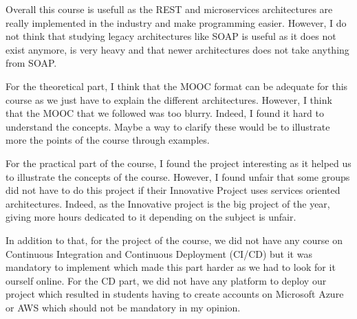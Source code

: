 Overall this course is usefull as the REST and microservices architectures are really implemented in the industry and make programming easier. However, I do not think that studying legacy architectures like SOAP is useful as it does not exist anymore, is very heavy and that newer architectures does not take anything from SOAP.
\smallskip

For the theoretical part, I think that the MOOC format can be adequate for this course as we just have to explain the different architectures. However, I think that the MOOC that we followed was too blurry. Indeed, I found it hard to understand the concepts. Maybe a way to clarify these would be to illustrate more the points of the course through examples.
\smallskip

For the practical part of the course, I found the project interesting as it helped us to illustrate the concepts of the course. However, I found unfair that some groups did not have to do this project if their Innovative Project uses services oriented architectures. Indeed, as the Innovative project is the big project of the year, giving more hours dedicated to it depending on the subject is unfair.
\smallskip

In addition to that, for the project of the course, we did not have any course on Continuous Integration and Continuous Deployment (CI/CD) but it was mandatory to implement which made this part harder as we had to look for it ourself online. For the CD part, we did not have any platform to deploy our project which resulted in students having to create accounts on Microsoft Azure or AWS which should not be mandatory in my opinion.
